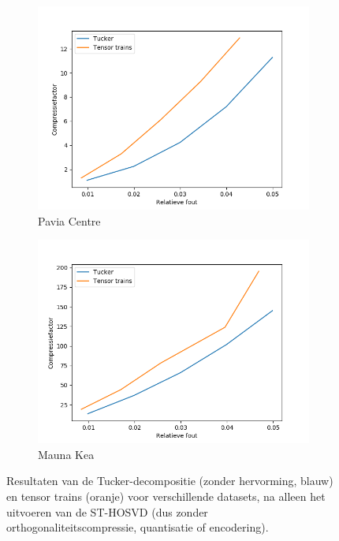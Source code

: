 \begin{figure}[H]
\begin{subfigure}{0.48\textwidth}
  \includegraphics[width=\linewidth]{images/tensor_trains_st_hosvd_results_Pavia_Centre.png}
  \caption{Pavia Centre}
\end{subfigure}
\begin{subfigure}{0.48\textwidth}
  \centering
  \includegraphics[width=\linewidth]{images/tensor_trains_st_hosvd_results_Mauna_Kea.png}
  \caption{Mauna Kea}
\end{subfigure}
\caption{Resultaten van de Tucker-decompositie (zonder hervorming, blauw) en tensor trains (oranje) voor verschillende datasets, na alleen het uitvoeren van de ST-HOSVD (dus zonder orthogonaliteitscompressie, quantisatie of encodering).}
\label{fig:tensor_trains_st_hosvd_results}
\end{figure}

